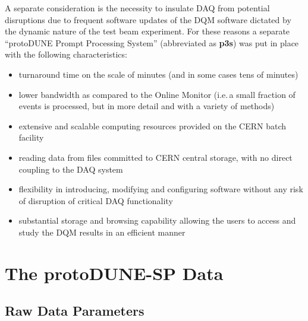 \documentclass{webofc}
\newcommand{\pd}{protoDUNE\xspace}
\begin{document}
A separate consideration is the necessity to insulate DAQ from
potential disruptions due to frequent software updates of the DQM software dictated by
the dynamic nature of the test beam experiment. 
For these reasons a separate ``\pd Prompt Processing System'' (abbreviated as \textbf{p3s}) was put
in place \cite{eps} with the following characteristics:
\begin{itemize} 

\item turnaround time on the scale of minutes (and in some cases tens of minutes)

\item lower bandwidth as compared to the Online Monitor (i.e.\,a small fraction of events is processed,
but in more detail and with a variety of methods)

\item extensive and scalable computing resources provided on the CERN batch facility

\item reading data from files committed to CERN central storage, with no direct coupling to the DAQ system

\item flexibility in introducing, modifying and configuring software without any risk of disruption of
critical DAQ functionality

\item substantial storage and browsing capability allowing the users to access and study
the DQM results in an efficient manner

\end{itemize}


\section{The protoDUNE-SP Data}
\subsection{Raw Data Parameters}
\label{sec:np04_data_rate}
\end{document}
